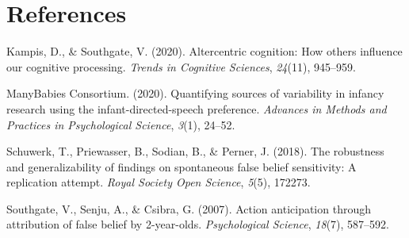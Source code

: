\documentclass[
  man, donotrepeattitle,floatsintext]{apa6}
\newlength{\cslhangindent}
\newenvironment{CSLReferences}[2] %
 {\begin{list}{}{%
  \setlength{\itemindent}{0pt}
  \setlength{\leftmargin}{0pt}
  \setlength{\parsep}{0pt}
  \ifodd #1
   \setlength{\leftmargin}{\cslhangindent}
   \setlength{\itemindent}{-1\cslhangindent}
  \fi
  \setlength{\itemsep}{#2\baselineskip}}}
 {\end{list}}
\begin{document}
\newpage

\section{References}\label{references}

\begingroup
\setlength{\parindent}{-0.5in}
\setlength{\leftskip}{0.5in}

\label{refs}
\begin{CSLReferences}{1}{0}
Kampis, D., \& Southgate, V. (2020). Altercentric cognition: How others influence our cognitive processing. \emph{Trends in Cognitive Sciences}, \emph{24}(11), 945--959.

ManyBabies Consortium. (2020). Quantifying sources of variability in infancy research using the infant-directed-speech preference. \emph{Advances in Methods and Practices in Psychological Science}, \emph{3}(1), 24--52.

Schuwerk, T., Priewasser, B., Sodian, B., \& Perner, J. (2018). The robustness and generalizability of findings on spontaneous false belief sensitivity: A replication attempt. \emph{Royal Society Open Science}, \emph{5}(5), 172273.

Southgate, V., Senju, A., \& Csibra, G. (2007). Action anticipation through attribution of false belief by 2-year-olds. \emph{Psychological Science}, \emph{18}(7), 587--592.

\end{CSLReferences}

\endgroup
\end{document}
